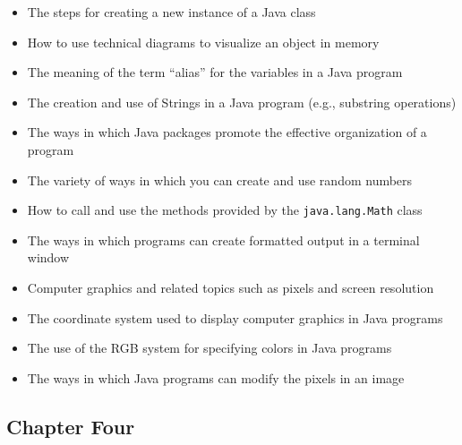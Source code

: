 \documentclass[11pt]{article}
\begin{document}
\begin{itemize}

  \itemsep 0in

  \item The steps for creating a new instance of a Java class
  \item How to use technical diagrams to visualize an object in memory
  \item The meaning of the term ``alias'' for the variables in a Java program
  \item The creation and use of Strings in a Java program (e.g., substring operations)
  \item The ways in which Java packages promote the effective organization of a program
  \item The variety of ways in which you can create and use random numbers
  \item How to call and use the methods provided by the {\tt java.lang.Math} class
  \item The ways in which programs can create formatted output in a terminal window
  \item Computer graphics and related topics such as pixels and screen resolution
  \item The coordinate system used to display computer graphics in Java programs
  \item The use of the RGB system for specifying colors in Java programs
  \item The ways in which Java programs can modify the pixels in an image

\end{itemize}

\subsection*{Chapter Four}
\end{document}
